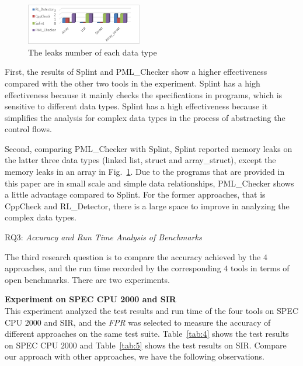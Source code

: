 \begin{figure}[!h]
\center
\includegraphics[width=0.45\textwidth]{figure/fig8-fig12/fig9}
\caption{The leaks number of each data type}
\label{fig:9}
\end{figure}


First, the results of Splint and PML\_Checker show a higher effectiveness compared with the other two tools in the experiment. Splint has a high effectiveness because it mainly checks the specifications in programs, which is sensitive to different data types. Splint has a high effectiveness because it simplifies the analysis for complex data types in the process of abstracting the control flows. 

Second, comparing PML\_Checker with Splint, Splint reported memory leaks on the latter three data types (linked list, struct and array\_struct), except the memory leaks in an array in Fig.~\ref{fig:9}. Due to the programs that are provided in this paper are in small scale and simple data relationships, PML\_Checker shows a little advantage compared to Splint. For the former approaches, that is CppCheck and RL\_Detector, there is a large space to improve in analyzing the complex data types.

\noindent RQ3: \textit{Accuracy and Run Time Analysis of Benchmarks}

The third research question is to compare the accuracy achieved by the $4$ approaches, and the run time recorded by the corresponding $4$ tools in terms of open benchmarks. There are two experiments.

\noindent\textbf{Experiment on SPEC CPU 2000 and SIR} 
\\
This experiment analyzed the test results and run time of the four tools on SPEC CPU $2000$ and SIR, and the \textit{FPR} was selected to measure the accuracy of different approaches on the same test suite. Table~\ref{tab:4} shows the test results on SPEC CPU $2000$ and Table~\ref{tab:5} shows the test results on SIR. Compare our approach with other approaches, we have the following observations. 


